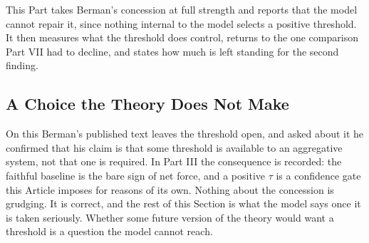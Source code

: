 This Part takes Berman's concession at full strength and reports that
the model cannot repair it, since nothing internal to the model selects a
positive threshold. It then measures what the threshold does control,
returns to the one comparison Part VII had to decline, and states how much
is left standing for the second finding.

\subsection{A Choice the Theory Does Not Make}

On this Berman's published text leaves the threshold open, and asked about
it he confirmed that his claim is that some threshold is available to an
aggregative system, not that one is required. In Part III the consequence
is recorded: the faithful baseline is the bare sign of net force, and a
positive $\tau$ is a confidence gate this Article imposes for reasons of
its own. Nothing about the concession is grudging. It is correct, and the rest of
this Section is what the model says once it is taken seriously. Whether
some future version of the theory would want a threshold is a question the
model cannot reach.

